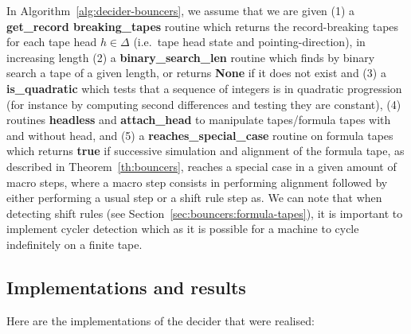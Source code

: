 \begin{remark}
    In Algorithm~\ref{alg:decider-bouncers}, we assume that we are given (1) a \textbf{get\_record breaking\_tapes} routine which returns the record-breaking tapes for each tape head $h\in\Delta$ (i.e.\ tape head state and pointing-direction), in increasing length (2) a \textbf{binary\_search\_len} routine which finds by binary search a tape of a given length, or returns \textbf{None} if it does not exist and (3) a \textbf{is\_quadratic} which tests that a sequence of integers is in quadratic progression (for instance by computing second differences and testing they are constant), (4) routines \textbf{headless} and \textbf{attach\_head} to manipulate tapes/formula tapes with and without head, and (5) a \textbf{reaches\_special\_case} routine on formula tapes which returns \textbf{true} if successive simulation and alignment of the formula tape, as described in Theorem~\ref{th:bouncers}, reaches a special case in a given amount of macro steps, where a macro step consists in performing alignment followed by either performing a usual step or a shift rule step as. We can note that when detecting shift rules (see Section~\ref{sec:bouncers:formula-tapes}), it is important to implement cycler detection which as it is possible for a machine to cycle indefinitely on a finite tape.
\end{remark}








\subsection{Implementations and results}\label{sec:bouncers-implem}


Here are the implementations of the decider that were realised:

